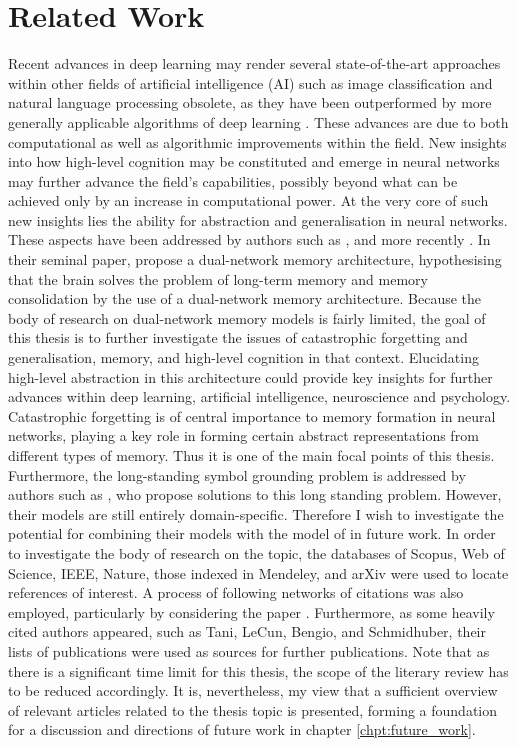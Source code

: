 
\chapter{Related Work}

Recent advances in deep learning may render several state-of-the-art approaches within other fields of artificial intelligence (AI) such as image classification and natural language processing obsolete, as they have been outperformed by more generally applicable algorithms of deep learning \citep{LeCun2015, Schmidhuber2014}. These advances are due to both computational as well as algorithmic improvements within the field. New insights into how high-level cognition may be constituted and emerge in neural networks may further advance the field's capabilities, possibly beyond what can be achieved only by an increase in computational power. At the very core of such new insights lies the ability for abstraction and generalisation in neural networks. These aspects have been addressed by authors such as \cite{McClelland1995}, and more recently \cite{Hattori2014}. In their seminal paper, \cite{McClelland1995} propose a dual-network memory architecture, hypothesising that the brain solves the problem of long-term memory and memory consolidation by the use of a dual-network memory architecture. Because the body of research on dual-network memory models is fairly limited, the goal of this thesis is to further investigate the issues of catastrophic forgetting and generalisation, memory, and high-level cognition in that context. Elucidating high-level abstraction in this architecture could provide key insights for further advances within deep learning, artificial intelligence, neuroscience and psychology. Catastrophic forgetting is of central importance to memory formation in neural networks, playing a key role in forming certain abstract representations from different types of memory. Thus it is one of the main focal points of this thesis. Furthermore, the long-standing symbol grounding problem is addressed by authors such as \cite{Yamashita2008, Tani2014}, who propose solutions to this long standing problem. However, their models are still entirely domain-specific. Therefore I wish to investigate the potential for combining their models with the model of \citep{Hattori2014} in future work.
In order to investigate the body of research on the topic, the databases of Scopus, Web of Science, IEEE, Nature, those indexed in Mendeley, and arXiv were used to locate references of interest. A process of following networks of citations was also employed, particularly by considering the paper \citep{McClelland1995}. Furthermore, as some heavily cited authors appeared, such as Tani, LeCun, Bengio, and Schmidhuber, their lists of publications were used as sources for further publications. Note that as there is a significant time limit for this thesis, the scope of the literary review has to be reduced accordingly. It is, nevertheless, my view that a sufficient overview of relevant articles related to the thesis topic is presented, forming a foundation for a discussion and directions of future work in chapter \ref{chpt:future_work}.

